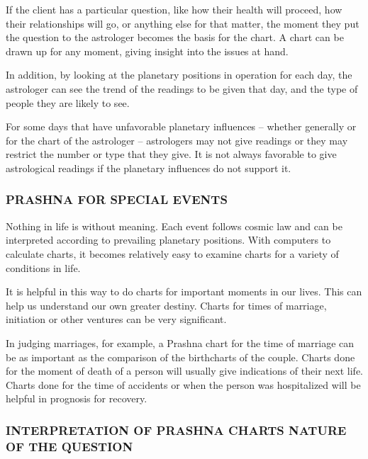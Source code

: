  

If the client has a particular question, like how their health will proceed, how their relationships will go, or anything else for that matter, the moment they put the question to the astrologer becomes the basis for the chart. A chart can be drawn up for any moment, giving insight into the issues at hand.

 

In addition, by looking at the planetary positions in operation for each day, the astrologer can see the trend of the readings to be given that day, and the type of people they are likely to see.

 

For some days that have unfavorable planetary influences – whether generally or for the chart of the astrologer – astrologers may not give readings or they may restrict the number or type that they give. It is not always favorable to give astrological readings if the planetary influences do not support it.

\subsubsection{PRASHNA  FOR SPECIAL EVENTS}

 

Nothing in life is without meaning. Each event follows cosmic law and can be interpreted according to prevailing planetary positions. With computers to calculate charts, it becomes relatively easy to examine charts for a variety of conditions in life.

 

It is helpful in this way to do charts for important moments in our lives. This can help us understand our own greater destiny. Charts for times of marriage, initiation or other ventures can be very significant.

 

In judging marriages, for example, a Prashna chart for the time of marriage can be as important as the comparison of the birthcharts of the couple. Charts done for the moment of death of a person will usually give indications of their next life. Charts done for the time of accidents or when the person was hospitalized will be helpful in prognosis for recovery.

 

\subsubsection{INTERPRETATION OF PRASHNA CHARTS
NATURE OF THE QUESTION}
 

